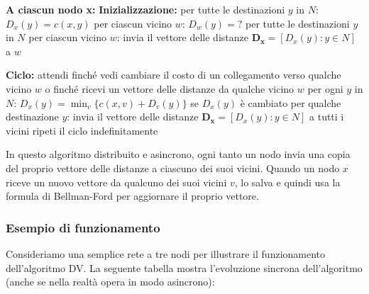 \begin{algorithm}[H]
\caption{Algoritmo Bellman-Ford}
\begin{algorithmic}[1]
\STATE \textbf{A ciascun nodo x:}
\STATE \textbf{Inizializzazione:}
\STATE \hspace{0.5cm}per tutte le destinazioni $y$ in $N$:
\STATE \hspace{1cm}$D_x(y) = c(x,y)$ 
\STATE \hspace{0.5cm}per ciascun vicino $w$:
\STATE \hspace{1cm}$D_w(y) = ?$ per tutte le destinazioni $y$ in $N$
\STATE \hspace{0.5cm}per ciascun vicino $w$:
\STATE \hspace{1cm}invia il vettore delle distanze $\mathbf{D_x} = [D_x(y): y \in N]$ a $w$

\STATE \textbf{Ciclo:}
\STATE \hspace{0.5cm}attendi finché vedi cambiare il costo di un collegamento verso
\STATE \hspace{0.5cm}qualche vicino $w$ o finché ricevi un vettore delle distanze
\STATE \hspace{0.5cm}da qualche vicino $w$
\STATE \hspace{0.5cm}per ogni $y$ in $N$:
\STATE \hspace{1cm}$D_x(y) = \min_v \{c(x,v) + D_v(y)\}$
\STATE \hspace{0.5cm}se $D_x(y)$ è cambiato per qualche destinazione $y$:
\STATE \hspace{1cm}invia il vettore delle distanze $\mathbf{D_x} = [D_x(y): y \in N]$ a tutti i vicini
\STATE \hspace{0.5cm}ripeti il ciclo indefinitamente
\end{algorithmic}
\end{algorithm}

In questo algoritmo distribuito e asincrono, ogni tanto un nodo invia una copia del proprio vettore delle distanze a ciascuno dei suoi vicini. Quando un nodo $x$ riceve un nuovo vettore da qualcuno dei suoi vicini $v$, lo salva e quindi usa la formula di Bellman-Ford per aggiornare il proprio vettore.

\subsubsection*{Esempio di funzionamento}
Consideriamo una semplice rete a tre nodi per illustrare il funzionamento dell'algoritmo DV. La seguente tabella mostra l'evoluzione sincrona dell'algoritmo (anche se nella realtà opera in modo asincrono):


